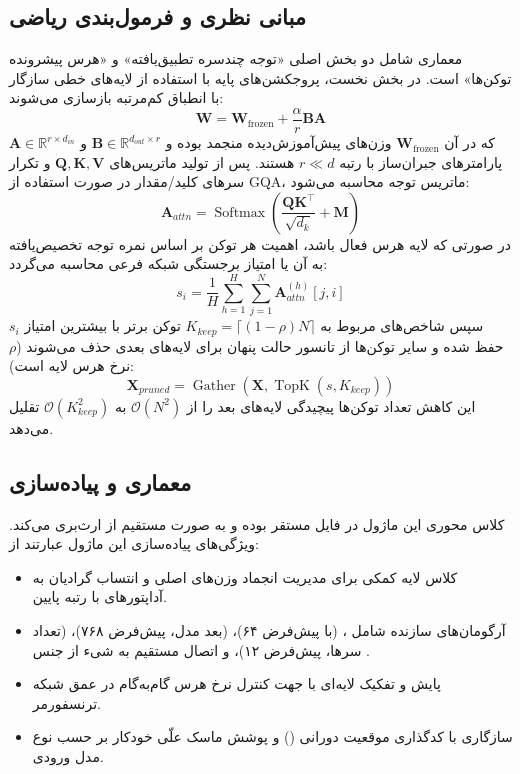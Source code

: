 \subsection{مبانی نظری و فرمول‌بندی ریاضی}
معماری  شامل دو بخش اصلی «توجه چندسره تطبیق‌یافته» و «هرس پیشرونده توکن‌ها» است. در بخش نخست، پروجکشن‌های پایه با استفاده از لایه‌های خطی سازگار با انطباق کم‌مرتبه بازسازی می‌شوند:
\begin{equation}
\mathbf{W} = \mathbf{W}_{\text{frozen}} + \frac{\alpha}{r} \mathbf{B} \mathbf{A}
\end{equation}
که در آن $\mathbf{W}_{\text{frozen}}$ وزن‌های پیش‌آموزش‌دیده منجمد بوده و $\mathbf{B} \in \mathbb{R}^{d_{out} \times r}$ و $\mathbf{A} \in \mathbb{R}^{r \times d_{in}}$ پارامترهای جبران‌ساز با رتبه $r \ll d$ هستند. پس از تولید ماتریس‌های $\mathbf{Q}, \mathbf{K}, \mathbf{V}$ و تکرار سرهای کلید/مقدار در صورت استفاده از GQA، ماتریس توجه محاسبه می‌شود:
\begin{equation}
\mathbf{A}_{attn} = \operatorname{Softmax}\left(\frac{\mathbf{Q} \mathbf{K}^\top}{\sqrt{d_k}} + \mathbf{M}\right)
\end{equation}
در صورتی که لایه هرس فعال باشد، اهمیت هر توکن بر اساس نمره توجه تخصیص‌یافته به آن یا امتیاز برجستگی شبکه فرعی محاسبه می‌گردد:
\begin{equation}
s_i = \frac{1}{H} \sum_{h=1}^H \sum_{j=1}^N \mathbf{A}_{attn}^{(h)}[j, i]
\end{equation}
سپس شاخص‌های مربوط به $K_{keep} = \lceil (1 - \rho) N \rceil$ توکن برتر با بیشترین امتیاز $s_i$ حفظ شده و سایر توکن‌ها از تانسور حالت پنهان برای لایه‌های بعدی حذف می‌شوند ($\rho$ نرخ هرس لایه است):
\begin{equation}
\mathbf{X}_{pruned} = \operatorname{Gather}(\mathbf{X}, \operatorname{TopK}(s, K_{keep}))
\end{equation}
این کاهش تعداد توکن‌ها پیچیدگی لایه‌های بعد را از $\mathcal{O}(N^2)$ به $\mathcal{O}(K_{keep}^2)$ تقلیل می‌دهد.

\subsection{معماری و پیاده‌سازی}
کلاس محوری این ماژول  در فایل  مستقر بوده و به صورت مستقیم از  ارث‌بری می‌کند. ویژگی‌های پیاده‌سازی این ماژول عبارتند از:
\begin{itemize}
    \item کلاس لایه کمکی  برای مدیریت انجماد وزن‌های اصلی و انتساب گرادیان به آداپتورهای با رتبه پایین.
    \item آرگومان‌های سازنده شامل ،  (با پیش‌فرض ۶۴)،  (بعد مدل، پیش‌فرض ۷۶۸)،  (تعداد سرها، پیش‌فرض ۱۲)، و اتصال مستقیم به شیء  از جنس .
    \item پایش و تفکیک لایه‌ای با  جهت کنترل نرخ هرس گام‌به‌گام در عمق شبکه ترنسفورمر.
    \item سازگاری با کدگذاری موقعیت دورانی () و پوشش ماسک علّی خودکار بر حسب نوع مدل ورودی.
\end{itemize}

